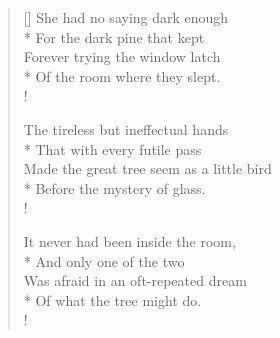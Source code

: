 \documentclass[MAIN]{subfiles}
\begin{document}
\settowidth{\versewidth}{Made the great tree seem as a little bird}
\begin{verse}[\versewidth]
She had no saying dark enough\\*
\vin For the dark pine that kept\\
Forever trying the window latch\\*
\vin Of the room where they slept.\\!

The tireless but ineffectual hands\\*
\vin That with every futile pass\\
Made the great tree seem as a little bird\\*
\vin Before the mystery of glass.\\!

It never had been inside the room,\\*
\vin And only one of the two\\
Was afraid in an oft-repeated dream\\*
\vin Of what the tree might do.\\!
\end{verse}
\end{document}
